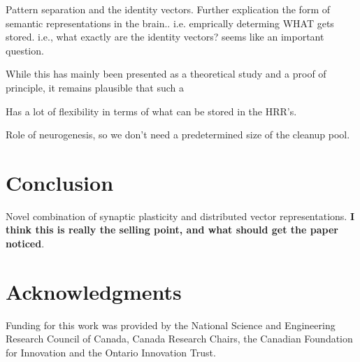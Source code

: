 \documentclass[10pt,letterpaper]{article}
\begin{document}
Pattern separation and the identity vectors.
Further explication the form of semantic representations in the brain.. i.e. emprically determing WHAT gets stored. i.e., what exactly are the identity vectors? seems like an important question.

While this has mainly been presented as a theoretical study and a proof of principle, it remains plausible that such a 

Has a lot of flexibility in terms of what can be stored in the HRR's.

Role of neurogenesis, so we don't need a predetermined size of the cleanup pool. 



\section{Conclusion}
Novel combination of synaptic plasticity and distributed vector representations. \textbf{I think this is really the selling point, and what should get the paper noticed}.

\section{Acknowledgments}
Funding for this work was provided by the National Science and Engineering Research Council of Canada, Canada Research Chairs, the Canadian Foundation for Innovation and the Ontario Innovation Trust.		


\setlength{\bibleftmargin}{.125in}
\setlength{\bibindent}{-\bibleftmargin}


\end{document}
